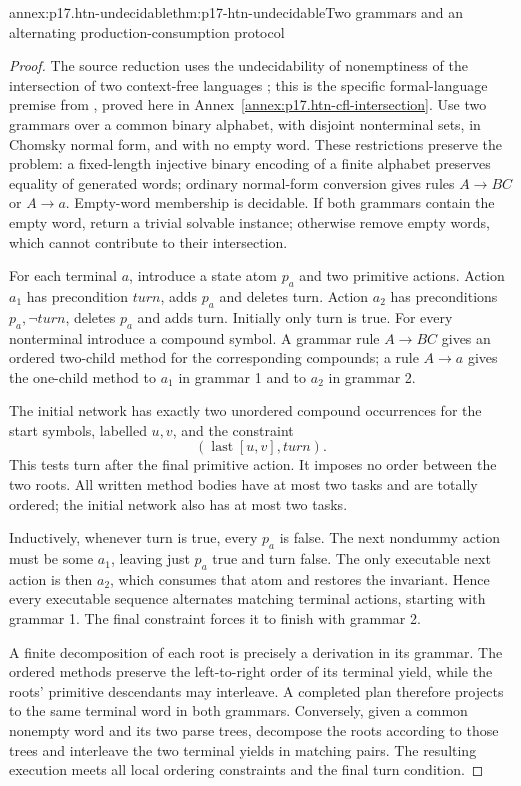 \begin{annexitem}{annex:p17.htn-undecidable}{thm:p17-htn-undecidable}{Two grammars and an alternating production-consumption protocol}
\begin{proof}
The source reduction uses the undecidability of nonemptiness of the
intersection of two context-free languages
\cite[Appendix, Theorem~1]{ErolHendlerNau1996HTNComplexity}; this is the
specific formal-language premise from \cite{HopcroftUllman1979HTNPremise},
proved here in Annex~\ref{annex:p17.htn-cfl-intersection}.
Use two grammars over a common binary alphabet, with disjoint nonterminal
sets, in Chomsky normal form, and with no empty word. These restrictions
preserve the problem: a fixed-length injective binary encoding of a finite
alphabet preserves equality of generated words; ordinary normal-form conversion
gives rules \(A\to BC\) or \(A\to a\). Empty-word membership is decidable.
If both grammars contain the empty word, return a trivial solvable instance;
otherwise remove empty words, which cannot contribute to their intersection.

For each terminal \(a\), introduce a state atom \(p_a\) and two primitive
actions. Action \(a_1\) has precondition \(\mathit{turn}\), adds \(p_a\)
and deletes turn. Action \(a_2\) has preconditions \(p_a,\neg\mathit{turn}\),
deletes \(p_a\) and adds turn. Initially only turn is true. For every
nonterminal introduce a compound symbol. A grammar rule \(A\to BC\)
gives an ordered two-child method for the corresponding compounds; a rule
\(A\to a\) gives the one-child method to \(a_1\) in grammar 1 and to
\(a_2\) in grammar 2.

The initial network has exactly two unordered compound occurrences for the
start symbols, labelled \(u,v\), and the constraint
\[
 (\operatorname{last}[u,v],\mathit{turn}).
\]
This tests turn after the final primitive action. It imposes no order between
the two roots. All written method bodies have at most two tasks and are
totally ordered; the initial network also has at most two tasks.

Inductively, whenever turn is true, every \(p_a\) is false. The next
nondummy action must be some \(a_1\), leaving just \(p_a\) true and turn
false. The only executable next action is then \(a_2\), which consumes
that atom and restores the invariant. Hence every executable sequence
alternates matching terminal actions, starting with grammar 1. The final
constraint forces it to finish with grammar 2.

A finite decomposition of each root is precisely a derivation in its grammar.
The ordered methods preserve the left-to-right order of its terminal yield,
while the roots' primitive descendants may interleave. A completed plan
therefore projects to the same terminal word in both grammars. Conversely,
given a common nonempty word and its two parse trees, decompose the roots
according to those trees and interleave the two terminal yields in matching
pairs. The resulting execution meets all local ordering constraints and the
final turn condition.


\end{proof}
\end{annexitem}
